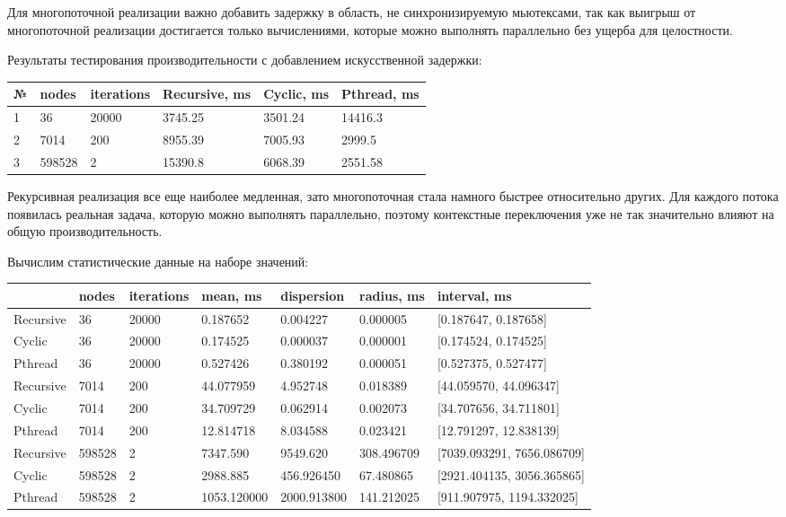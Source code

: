 \documentclass[14pt,a4paper,report]{report}
\begin{document}
Для многопоточной реализации важно добавить задержку в область, не синхронизируемую мьютексами, так как выигрыш от многопоточной реализации достигается только вычислениями, которые можно выполнять параллельно без ущерба для целостности.

Результаты тестирования производительности с добавлением искусственной задержки:

\begin{table}[h!]
	\centering
	\bgroup
	\def\arraystretch{1}
	\begin{tabular}{ | m{0.8cm} | m{2.0cm} | m{1.8cm} | m{2.8cm} | m{2.6cm} | m{2.6cm} | }
		\hline
		№ & nodes & iterations & Recursive, ms & Cyclic, ms & Pthread, ms \\ \hline
		1 & 36 & 20000 & 3745.25 & 3501.24 & 14416.3 \\ \hline
		2 & 7014 & 200 & 8955.39 & 7005.93 & 2999.5 \\ \hline
		3 & 598528 & 2 & 15390.8 & 6068.39 & 2551.58 \\
		\hline
	\end{tabular}
	\egroup
\end{table}

Рекурсивная реализация все еще наиболее медленная, зато многопоточная стала намного быстрее относительно других. Для каждого потока появилась реальная задача, которую можно выполнять параллельно, поэтому контекстные переключения уже не так значительно влияют на общую производительность.

Вычислим статистические данные на наборе значений:

\begin{table}[h!]
	\centering
	\bgroup
	\def\arraystretch{1}
	\begin{tabular}{ | m{1.5cm} | m{1.5cm} | m{1.5cm} | m{2.0cm} | m{2.0cm} | m{2.0cm} | m{4.1cm} | }
		\hline
		& nodes & iterations & mean, ms & dispersion & radius, ms & interval, ms \\ \hline
		Recursive & 36 & 20000 & 0.187652 & 0.004227 & 0.000005 & [0.187647, 0.187658] \\ \hline
		Cyclic & 36 & 20000 & 0.174525 & 0.000037 & 0.000001 & [0.174524, 0.174525] \\ \hline
		Pthread & 36 & 20000 & 0.527426 & 0.380192 & 0.000051 & [0.527375, 0.527477] \\ \hline \hline
		Recursive & 7014 & 200 & 44.077959 & 4.952748 & 0.018389 & [44.059570, 44.096347] \\ \hline
		Cyclic & 7014 & 200 & 34.709729 & 0.062914 & 0.002073 & [34.707656, 34.711801] \\ \hline
		Pthread & 7014 & 200 & 12.814718 & 8.034588 & 0.023421 & [12.791297, 12.838139] \\ \hline \hline
		Recursive & 598528 & 2 & 7347.590 & 9549.620 & 308.496709 & [7039.093291, 7656.086709] \\ \hline
		Cyclic & 598528 & 2 & 2988.885 & 456.926450 & 67.480865 & [2921.404135, 3056.365865] \\ \hline
		Pthread & 598528 & 2 & 1053.120000 & 2000.913800 & 141.212025 & [911.907975, 1194.332025] \\
		\hline
	\end{tabular}
	\egroup
\end{table}
\end{document}
